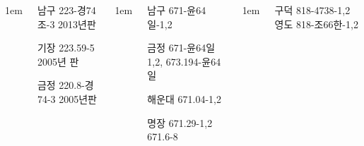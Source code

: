 \documentclass[	17pt, 
							a1paper, 
							portrait, %
							margin=0mm, %
							innermargin=10mm,  		%
							blockverticalspace=4mm, %
							colspace=5mm, 
							subcolspace=0mm
							]{tikzposter}
\begin{document}
\begin{columns}
			{
					\setlength{\leftmargini}{7em}
					\setlength{\labelsep} {1em}
				\begin{LARGE}
남구 223-경74조-3   2013년판

기장  223.59-5         2005년 판

금정  220.8-경74-3  2005년판
				\end{LARGE}
			}


			{
					\setlength{\leftmargini}{7em}
					\setlength{\labelsep} {1em}
				\begin{LARGE}
남구 671-윤64일-1,2

금정 671-윤64일1,2,  673.194-윤64일

해운대  671.04-1,2    

명장    671.29-1,2   671.6-8
				\end{LARGE}
			}



			{
					\setlength{\leftmargini}{7em}
					\setlength{\labelsep} {1em}
				\begin{LARGE}
구덕    818-4738-1,2   	%
영도    818-조66한-1,2 	%


\end{LARGE}}
\end{columns}
\end{document}
